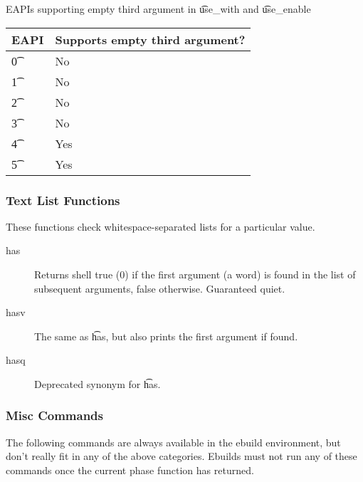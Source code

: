 \begin{centertable}{EAPIs supporting empty third argument in \t{use\_with} and \t{use\_enable}}
    \label{tab:use-with-third-arg}
    \begin{tabular}{ l l }
        \toprule
            \multicolumn{1}{c}{\textbf{EAPI}} &
            \multicolumn{1}{c}{\textbf{Supports empty third argument?}} \\
            \midrule
    \t{0} & No \\
    \t{1} & No \\
    \t{2} & No \\
    \t{3} & No \\
    \t{4} & Yes \\
    \t{5} & Yes \\
    \bottomrule
    \end{tabular}
\end{centertable}

\subsubsection{Text List Functions}
These functions check whitespace-separated lists for a particular value.

\begin{description}
\item[has] Returns shell true (0) if the first argument (a word) is found in the list of subsequent
    arguments, false otherwise. Guaranteed quiet.
\item[hasv] The same as \t{has}, but also prints the first argument if found.
\item[hasq] Deprecated synonym for \t{has}.
\end{description}

\subsubsection{Misc Commands}
The following commands are always available in the ebuild environment, but don't really fit in any
of the above categories. Ebuilds must not run any of these commands once the current phase function
has returned.

